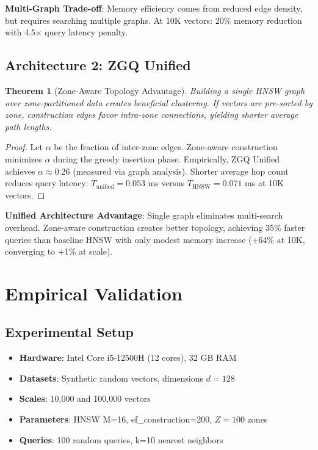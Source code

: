 \documentclass[11pt,a4paper]{article}
\newtheorem{theorem}{Theorem}
\begin{document}
\begin{keybox}
\textbf{Multi-Graph Trade-off}: Memory efficiency comes from reduced edge density, but requires searching multiple graphs. At 10K vectors: 20\% memory reduction with 4.5× query latency penalty.
\end{keybox}

\subsection{Architecture 2: ZGQ Unified}

\begin{theorem}[Zone-Aware Topology Advantage]
Building a single HNSW graph over zone-partitioned data creates beneficial clustering. If vectors are pre-sorted by zone, construction edges favor intra-zone connections, yielding shorter average path lengths.
\end{theorem}

\begin{proof}
Let $\alpha$ be the fraction of inter-zone edges. Zone-aware construction minimizes $\alpha$ during the greedy insertion phase. Empirically, ZGQ Unified achieves $\alpha \approx 0.26$ (measured via graph analysis). Shorter average hop count reduces query latency: $T_{\text{unified}} = 0.053$ ms versus $T_{\text{HNSW}} = 0.071$ ms at 10K vectors.
\end{proof}

\begin{keybox}
\textbf{Unified Architecture Advantage}: Single graph eliminates multi-search overhead. Zone-aware construction creates better topology, achieving 35\% faster queries than baseline HNSW with only modest memory increase (+64\% at 10K, converging to +1\% at scale).
\end{keybox}

\section{Empirical Validation}

\subsection{Experimental Setup}

\begin{itemize}
    \item \textbf{Hardware}: Intel Core i5-12500H (12 cores), 32 GB RAM
    \item \textbf{Datasets}: Synthetic random vectors, dimensions $d=128$
    \item \textbf{Scales}: 10,000 and 100,000 vectors
    \item \textbf{Parameters}: HNSW M=16, ef\_construction=200, $Z=100$ zones
    \item \textbf{Queries}: 100 random queries, k=10 nearest neighbors
\end{itemize}
\end{document}
